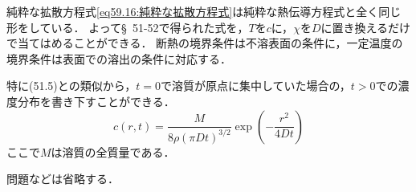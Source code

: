 純粋な拡散方程式\eqref{eq59.16:純粋な拡散方程式}は純粋な熱伝導方程式と全く同じ形をしている．
よって\S~51-52で得られた式を，$T$を$c$に，$\chi$を$D$に置き換えるだけで当てはめることができる．
断熱の境界条件は不溶表面の条件に，一定温度の境界条件は表面での溶出の条件に対応する．


特に(51.5)との類似から，$t=0$で溶質が原点に集中していた場合の，$t>0$での濃度分布を書き下すことができる．
\begin{equation}\label{eq59.17:拡散方程式のGreen関数}
    c(r,t) = \frac{M}{8\rho(\pi Dt)^{3/2}} \exp\left( - \frac{r^2}{4Dt} \right)
\end{equation}
ここで$M$は溶質の全質量である．



問題などは省略する．


\BackToTheToc